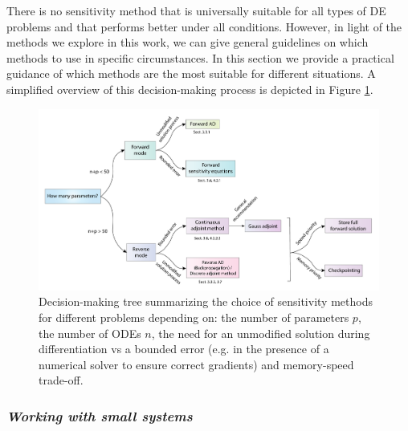 

There is no sensitivity method that is universally suitable for all types of DE problems and that performs better under all conditions. 
However, in light of the methods we explore in this work, we can give general guidelines on which methods to use in specific circumstances.
In this section we provide a practical guidance of which methods are the most suitable for different situations. 
A simplified overview of this decision-making process is depicted in Figure \ref{fig:roadmap}. 

\begin{figure}[tb]
    \centering
    \includegraphics[width=1\textwidth]{figures/roadmap.pdf}
    \caption{Decision-making tree summarizing the choice of sensitivity methods for different problems depending on: the number of parameters $p$, the number of ODEs $n$, the need for an unmodified solution during differentiation vs a bounded error (e.g. in the presence of a numerical solver to ensure correct gradients) and memory-speed trade-off.}
    \label{fig:roadmap}
\end{figure}


\subsubsection*{\textit{Working with small systems}}

